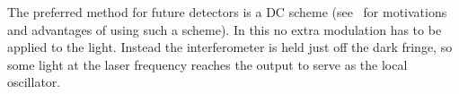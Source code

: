 The preferred method for future detectors is a DC scheme
(see~\cite{Fritschel:2003, Ward:2008, Hild:2009} for motivations and
advantages of using such a scheme). In this no extra modulation has to
be applied to the light. Instead the interferometer is held just off
the dark fringe, so some light at the laser frequency reaches the
output to serve as the local oscillator.


\newpage
